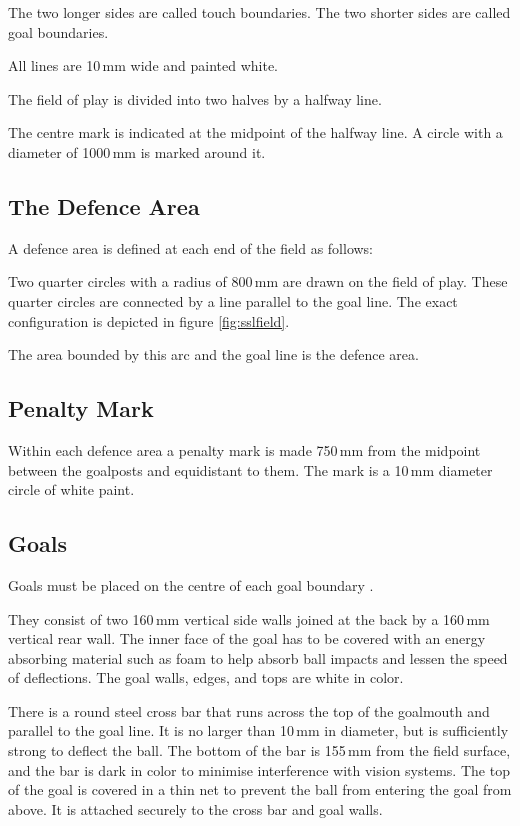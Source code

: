 The two longer sides are called touch boundaries.
The two shorter sides are called goal boundaries.

All lines are 10\,mm wide and painted white.

The field of play is divided into two halves by a halfway line.

The centre mark is indicated at the midpoint of the halfway line.
A circle with a diameter of 1000\,mm is marked around it.

\subsection{The Defence Area}
A defence area is defined at each end of the field as follows:

Two quarter circles with a radius of 800\,mm are drawn on the field of play.
These quarter circles are connected by a line parallel to the goal line.
The exact configuration is depicted in figure \ref{fig:sslfield}.

The area bounded by this arc and the goal line is the defence area.

\subsection{Penalty Mark}
Within each defence area a penalty mark is made 750\,mm from the midpoint between the goalposts and equidistant to them.
The mark is a 10\,mm diameter circle of white paint.

\subsection{Goals}
Goals must be placed on the centre of each goal boundary .

They consist of two 160\,mm vertical side walls joined at the back by a 160\,mm vertical rear wall.
The inner face of the goal has to be covered with an energy absorbing material such as foam to help absorb ball impacts and lessen the speed of deflections.
The goal walls, edges, and tops are white in color.

There is a round steel cross bar that runs across the top of the goalmouth and parallel to the goal line.
It is no larger than 10\,mm in diameter, but is sufficiently strong to deflect the ball.
The bottom of the bar is 155\,mm from the field surface, and the bar is dark in color to minimise interference with vision systems.
The top of the goal is covered in a thin net to prevent the ball from entering the goal from above.
It is attached securely to the cross bar and goal walls.

